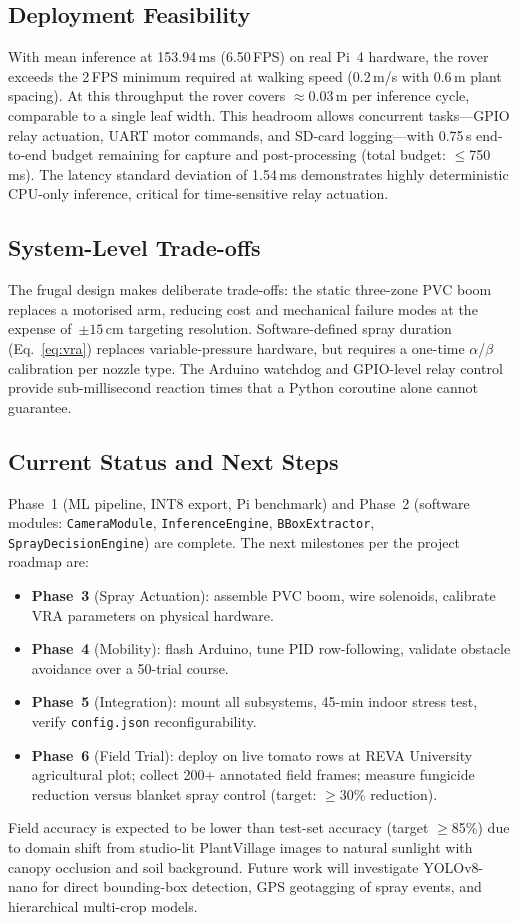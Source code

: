 \documentclass[conference]{IEEEtran}
\begin{document}
\subsection{Deployment Feasibility}
With mean inference at 153.94\,ms (6.50\,FPS) on real Pi~4 hardware,
the rover exceeds the 2\,FPS minimum required at walking speed
(0.2\,m/s with 0.6\,m plant spacing). At this throughput the rover
covers $\approx$0.03\,m per inference cycle, comparable to a single
leaf width. This headroom allows concurrent tasks---GPIO relay actuation,
UART motor commands, and SD-card logging---with 0.75\,s end-to-end budget
remaining for capture and post-processing (total budget: $\leq$750\,ms).
The latency standard deviation of 1.54\,ms demonstrates highly
deterministic CPU-only inference, critical for time-sensitive relay
actuation.

\subsection{System-Level Trade-offs}
The frugal design makes deliberate trade-offs: the static three-zone PVC
boom replaces a motorised arm, reducing cost and mechanical failure modes
at the expense of~$\pm 15$\,cm targeting resolution. Software-defined
spray duration (Eq.~\ref{eq:vra}) replaces variable-pressure hardware,
but requires a one-time $\alpha$/$\beta$ calibration per nozzle type.
The Arduino watchdog and GPIO-level relay control provide sub-millisecond
reaction times that a Python coroutine alone cannot guarantee.

\subsection{Current Status and Next Steps}
Phase~1 (ML pipeline, INT8 export, Pi benchmark) and Phase~2 (software
modules: \texttt{CameraModule}, \texttt{InferenceEngine},
\texttt{BBoxExtractor}, \texttt{SprayDecisionEngine}) are complete. The
next milestones per the project roadmap are:
\begin{itemize}
    \item \textbf{Phase~3} (Spray Actuation): assemble PVC boom, wire
        solenoids, calibrate VRA parameters on physical hardware.
    \item \textbf{Phase~4} (Mobility): flash Arduino, tune PID
        row-following, validate obstacle avoidance over a 50-trial
        course.
    \item \textbf{Phase~5} (Integration): mount all subsystems, 45-min
        indoor stress test, verify \texttt{config.json} reconfigurability.
    \item \textbf{Phase~6} (Field Trial): deploy on live tomato rows at
        REVA University agricultural plot; collect 200+ annotated field
        frames; measure fungicide reduction versus blanket spray control
        (target: $\geq$30\% reduction).
\end{itemize}
Field accuracy is expected to be lower than test-set accuracy (target
$\geq$85\%) due to domain shift from studio-lit PlantVillage images to
natural sunlight with canopy occlusion and soil background. Future work
will investigate YOLOv8-nano for direct bounding-box detection, GPS
geotagging of spray events, and hierarchical multi-crop models.
\end{document}

